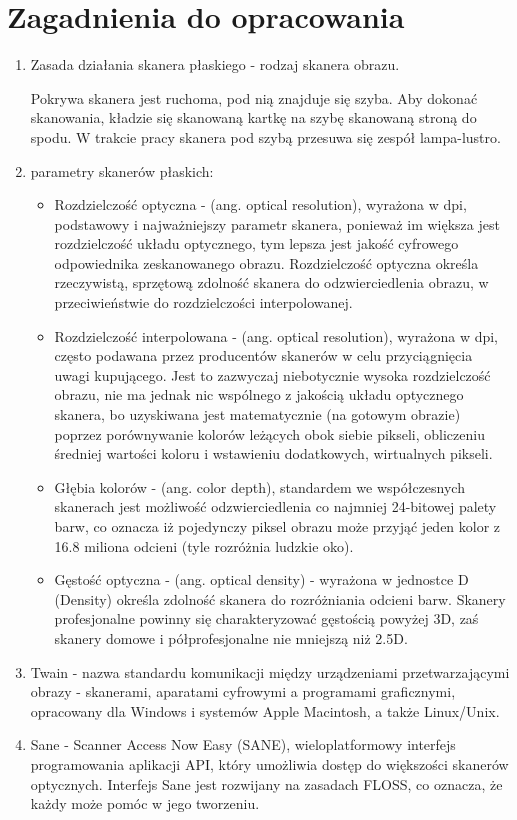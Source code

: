 \documentclass[a4paper,12pt]{extarticle}  %
\begin{document}
\section{Zagadnienia do opracowania}
\begin{enumerate}
	\item Zasada działania skanera płaskiego - rodzaj skanera obrazu.

	      Pokrywa skanera jest ruchoma, pod nią znajduje się szyba. Aby dokonać skanowania, kładzie się skanowaną kartkę na szybę skanowaną stroną do spodu. W trakcie pracy skanera pod szybą przesuwa się zespół lampa-lustro.

	\item parametry skanerów płaskich:
	      \begin{itemize}
		      \item Rozdzielczość optyczna - (ang. optical resolution), wyrażona w dpi, podstawowy i najważniejszy parametr skanera, ponieważ im większa jest rozdzielczość układu optycznego, tym lepsza jest jakość cyfrowego odpowiednika zeskanowanego obrazu. Rozdzielczość optyczna określa rzeczywistą, sprzętową zdolność skanera do odzwierciedlenia obrazu, w przeciwieństwie do rozdzielczości interpolowanej.
		      \item Rozdzielczość interpolowana - (ang. optical resolution), wyrażona w dpi, często podawana przez producentów skanerów w celu przyciągnięcia uwagi kupującego. Jest to zazwyczaj niebotycznie wysoka rozdzielczość obrazu, nie ma jednak nic wspólnego z jakością układu optycznego skanera, bo uzyskiwana jest matematycznie (na gotowym obrazie) poprzez porównywanie kolorów leżących obok siebie pikseli, obliczeniu średniej wartości koloru i wstawieniu dodatkowych, wirtualnych pikseli.
		      \item Głębia kolorów - (ang. color depth), standardem we współczesnych skanerach jest możliwość odzwierciedlenia co najmniej 24-bitowej palety barw, co oznacza iż pojedynczy piksel obrazu może przyjąć jeden kolor z 16.8 miliona odcieni (tyle rozróżnia ludzkie oko).
		      \item Gęstość optyczna - (ang. optical density) - wyrażona w jednostce D (Density) określa zdolność skanera do rozróżniania odcieni barw. Skanery profesjonalne powinny się charakteryzować gęstością powyżej 3D, zaś skanery domowe i półprofesjonalne nie mniejszą niż 2.5D.
	      \end{itemize}
	\item Twain - nazwa standardu komunikacji między urządzeniami przetwarzającymi obrazy - skanerami, aparatami cyfrowymi a programami graficznymi, opracowany dla Windows i systemów Apple Macintosh, a także Linux/Unix.
	\item Sane - Scanner Access Now Easy (SANE), wieloplatformowy interfejs programowania aplikacji API, który umożliwia dostęp do większości skanerów optycznych. Interfejs Sane jest rozwijany na zasadach FLOSS, co oznacza, że każdy może pomóc w jego tworzeniu.


\end{enumerate}
\end{document}
